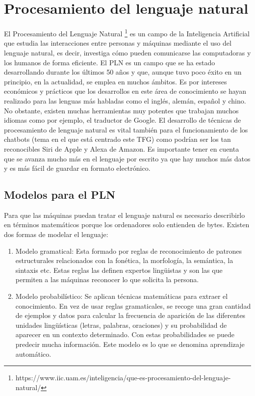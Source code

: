 \section{Procesamiento del lenguaje natural}

El Procesamiento del Lenguaje Natural \footnote{https://www.iic.uam.es/inteligencia/que-es-procesamiento-del-lenguaje-natural/} es un campo de la Inteligencia Artificial que estudia las interacciones entre personas y máquinas mediante el uso del lenguaje natural, es decir, investiga cómo pueden comunicarse las computadoras y los humanos de forma eficiente. El PLN es un campo que se ha estado desarrollando durante los últimos 50 años y que, aunque tuvo poco éxito en un principio, en la actualidad, se emplea en muchos ámbitos. Es por intereses económicos y prácticos que los desarrollos en este área de conocimiento se hayan realizado para las lenguas más habladas como el inglés, alemán, español y chino. No obstante, existen muchas herramientas muy potentes que trabajan muchos idiomas como por ejemplo, el traductor de Google. El desarrollo de técnicas de procesamiento de lenguaje natural es vital también para el funcionamiento de los chatbots (tema en el que está centrado este TFG) como podrían ser los tan reconocibles Siri de Apple y Alexa de Amazon. Es importante tener en cuenta que se avanza mucho más en el lenguaje por escrito ya que hay muchos más datos y es más fácil de guardar en formato electrónico.


\subsection{Modelos para el PLN}

Para que las máquinas puedan tratar el lenguaje natural es necesario describirlo en términos matemáticos porque los ordenadores solo entienden de bytes. Existen dos formas de modelar el lenguaje:

\begin{enumerate}
	\item Modelo gramatical: Esta formado por reglas de reconocimiento de patrones estructurales relacionados con la fonética, la morfología, la semántica, la sintaxis etc. Estas reglas las definen expertos lingüistas y son las que permiten a las máquinas reconocer lo que solicita la persona.
	\item Modelo probabilístico: Se aplican técnicas matemáticas para extraer el conocimiento. En vez de usar reglas gramaticales, se recoge una gran cantidad de ejemplos y datos para calcular la frecuencia de aparición de las diferentes unidades lingüísticas (letras, palabras, oraciones) y su probabilidad de aparecer en un contexto determinado. Con estas probabilidades se puede predecir mucha información. Este modelo es lo que se denomina aprendizaje automático.
\end{enumerate}

